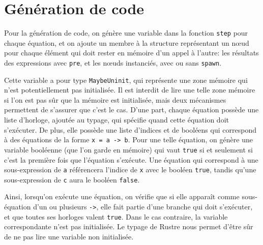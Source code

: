 \documentclass{scrartcl}
\begin{document}
\section{Génération de code}

Pour la génération de code, on génère une variable dans la fonction \texttt{step}
pour chaque équation, et on ajoute un membre à la structure représentant un n\oe{}ud
pour chaque élément qui doit rester en mémoire d'un appel à l'autre: les résultats des
expressions avec \texttt{pre}, et les n\oe{}uds instanciés, avec ou sans \texttt{spawn}.

Cette variable a pour type \texttt{MaybeUninit}, qui représente une zone mémoire
qui n'est potentiellement pas initialisée. Il est interdit de lire
une telle zone mémoire si l'on est pas sûr que la mémoire est initialisée,
mais deux mécanismes permettent de s'assurer que c'est le cas. D'une part, chaque
équation possède une liste d'horloge, ajoutée au typage, qui spécifie quand cette équation
doit s'exécuter. De plus, elle possède une liste d'indices et de booléens qui correspond à des équations de
la forme \texttt{x = a -> b}. Pour une telle équation, on génère une variable booléenne (que l'on garde en mémoire)
qui vaut \texttt{true} si et seulement si c'est la première fois que l'équation s'exécute.
Une équation qui correspond à une sous-expression de \texttt{a} référencera l'indice de \texttt{x}
avec le booléen \texttt{true}, tandis qu'une sous-expression de \texttt{c} aura le booléen \texttt{false}.

Ainsi, lorsqu'on exécute une équation, on vérifie que si elle apparaît comme sous-équation
d'un ou plusieurs \texttt{->}, elle fait partie d'une branche qui doit s'exécuter, et que toutes ses horloges
valent \texttt{true}. Dans le cas contraire, la variable correspondante n'est pas initialisée. Le typage
de Rustre nous permet d'être sûr de ne pas lire une variable non initialisée.

\pagebreak
\appendix
\end{document}
